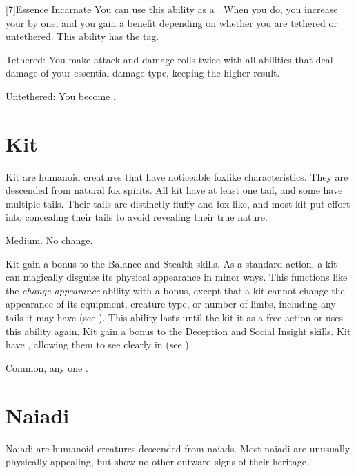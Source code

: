     [7]{Essence Incarnate} You can use this ability as a .
    When you do, you increase your  by one, and you gain a benefit depending on whether you are tethered or untethered.
    This ability has the  tag.
    \begin{raggeditemize}
        \item Tethered: You  make attack and damage rolls twice with all abilities that deal damage of your essential damage type, keeping the higher result.
        \item Untethered: You  become .
    \end{raggeditemize}

\section{Kit}

    Kit are humanoid creatures that have noticeable foxlike characteristics.
    They are descended from natural fox spirits.
    All kit have at least one tail, and some have multiple tails.
    Their tails are distinctly fluffy and fox-like, and most kit put effort into concealing their tails to avoid revealing their true nature.

     Medium.
     No change.
    \begin{itemize}
         Kit gain a  bonus to the Balance and Stealth skills.
         As a standard action, a kit can magically disguise its physical appearance in minor ways.
            This functions like the \textit{change appearance} ability with a  bonus, except that a kit cannot change the appearance of its equipment, creature type, or number of limbs, including any tails it may have (see ).
            This ability lasts until the kit  it as a free action or uses this ability again.
         Kit gain a  bonus to the Deception and Social Insight skills.
         Kit have , allowing them to see clearly in  (see ).
    \end{itemize}
     Common, any one .

\section{Naiadi}
    Naiadi are humanoid creatures descended from naiads.
    Most naiadi are unusually physically appealing, but show no other outward signs of their heritage.

